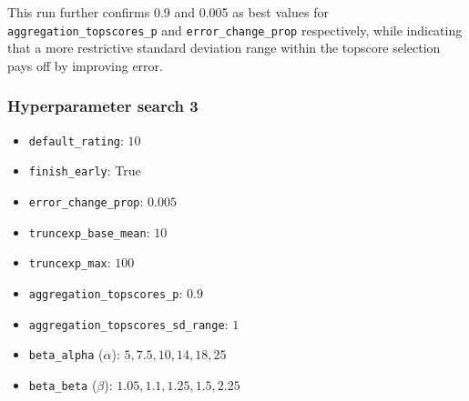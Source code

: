\documentclass[12pt,a4paper]{article}
\begin{document}

This run further confirms 0.9 and 0.005 as best values for \lstinline|aggregation_topscores_p| and \lstinline|error_change_prop| respectively, while indicating that a more restrictive standard deviation range within the topscore selection pays off by improving error.

\subsubsection{Hyperparameter search 3}


\begin{itemize}

\item \lstinline|default_rating|: $10$
\item \lstinline|finish_early|: True
\item \lstinline|error_change_prop|: $0.005$
\item \lstinline|truncexp_base_mean|: $10$
\item \lstinline|truncexp_max|: $100$
\item \lstinline|aggregation_topscores_p|: $0.9$
\item \lstinline|aggregation_topscores_sd_range|: $1$

\end{itemize}


\begin{itemize}

\item \lstinline|beta_alpha| ($\alpha$): $5, 7.5, 10, 14, 18, 25$
\item \lstinline|beta_beta| ($\beta$): $1.05, 1.1, 1.25, 1.5, 2.25$

\end{itemize}

\end{document}

